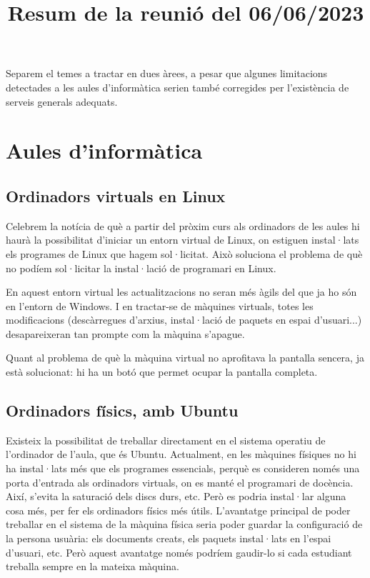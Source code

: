 \documentclass[a4paper,12pt]{article}
\title{Resum de la reunió del 06/06/2023}
\begin{document}
\maketitle

Separem el temes a tractar en dues àrees, a pesar que algunes limitacions detectades
a les aules d'informàtica serien també corregides per l'existència de serveis generals
adequats.

\section{Aules d'informàtica}
\subsection{Ordinadors virtuals en Linux}
Celebrem la notícia de què a partir del pròxim curs als ordinadors de les aules hi haurà la possibilitat d'iniciar
un entorn virtual de Linux, on estiguen instal·lats els programes de Linux que hagem
sol·licitat. Això soluciona el problema de què no podíem sol·licitar la instal·lació
de programari en Linux.

En aquest entorn virtual les actualitzacions no seran més àgils del que ja ho són en
l'entorn de Windows. I en tractar-se de màquines virtuals, totes les modificacions
(descàrregues d'arxius, instal·lació de paquets en espai d'usuari...) desapareixeran
tan prompte com la màquina s'apague.

Quant al problema de què la màquina virtual no aprofitava la pantalla sencera,
ja està solucionat: hi ha un botó que permet ocupar la pantalla completa.

\subsection{Ordinadors físics, amb Ubuntu}
Existeix la possibilitat de treballar directament en el sistema operatiu
de l'ordinador de l'aula, que és Ubuntu. Actualment, en les màquines físiques no
hi ha instal·lats més que els programes essencials, perquè es consideren només una
porta d'entrada als ordinadors virtuals, on es manté el programari de docència. Així,
s'evita la saturació dels discs durs, etc. Però es podria instal·lar alguna cosa més,
per fer els ordinadors físics més útils. L'avantatge principal de poder treballar en
el sistema de la màquina física seria poder guardar la configuració de la persona usuària:
els documents creats, els paquets instal·lats en l'espai d'usuari, etc. Però aquest
avantatge només podríem gaudir-lo si cada estudiant treballa sempre en la mateixa màquina.
\end{document}
